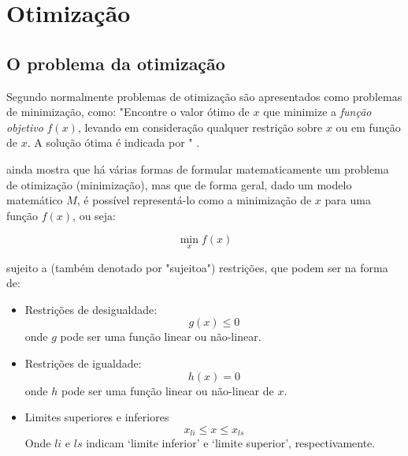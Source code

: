 
\chapter{Otimização}
\label{ch:otimizacao}

\section{O problema da otimização}
\label{sec:problema_da_otimizacao}

Segundo  normalmente problemas de otimização são apresentados
como problemas de minimização, como: "Encontre o valor ótimo de $x$ que minimize a
\textit{função objetivo} $f(x)$, levando em consideração qualquer restrição sobre $x$
ou em função de $x$. A solução ótima é indicada por
" \cite{Haugen2018}.

 ainda mostra que há várias formas de formular matematicamente
um problema de otimização (minimização), mas que de forma geral, dado um modelo
matemático $M$, é possível representá-lo como a minimização de $x$ para uma função
$f(x)$, ou seja:

\begin{equation}
	\min_{x} f(x)
\end{equation}

sujeito a (também denotado por "\acrshort{sujeitoa}") restrições, que podem ser na forma de:

\begin{itemize}
\item Restrições de desigualdade:
	\begin{equation}
		\label{eq:min_restr_desigualdade}
		g(x) \leq 0
	\end{equation}
	onde $g$ pode ser uma função linear ou não-linear.
	
\item Restrições de igualdade:
	\begin{equation}
		\label{eq:min_restr_igualdade}
		h(x) = 0
	\end{equation}
	onde $h$ pode ser uma função linear ou não-linear de $x$.
	
\item Limites superiores e inferiores
	\begin{equation}
		\label{eq:min_limites}
		x_{li} \leq x \leq x_{ls}
	\end{equation}
	Onde $li$ e $ls$ indicam `limite inferior' e `limite superior', respectivamente.
\end{itemize}

